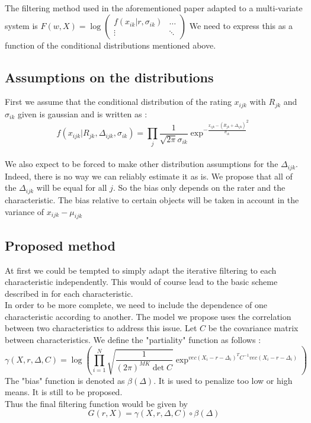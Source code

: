 The filtering method used in the aforementioned paper adapted to a multi-variate system is $F(w,X) = \log \begin{pmatrix}
f(x_{ik}|r,\sigma_{ik}) & \hdots \\
\vdots & \ddots 
\end{pmatrix}$
We need to express this as a function of the conditional distributions mentioned above.

\subsection{Assumptions on the distributions}
First we assume that the conditional distribution of the rating $x_{ijk}$ with $R_{jk}$ and $\sigma_{ik}$ given is gaussian and is written as : 
$$ f(x_{ijk}|R_{jk},\Delta_{ijk},\sigma_{ik}) = \prod_j \frac{1}{\sqrt{2 \pi} \sigma_{ik}} \exp^{-\frac{x_{ijk}-(R_{jk}+\Delta_{ijk})}{\sigma_{ik}}^2}$$\\
We also expect to be forced to make other distribution assumptions for the $\Delta_{ijk}$. Indeed, there is no way we can reliably estimate it as is. We propose that all of the $\Delta_{ijk}$ will be equal for all $j$. So the bias only depends on  the rater and the characteristic. The bias relative to certain objects will be taken in account in the variance of $x_{ijk}-\mu_{ijk}$

\subsection{Proposed method}
At first we could be tempted to simply adapt the iterative filtering to each characteristic independently. This would of course lead to the basic scheme described in \cite{Cristo1} for each characteristic.\\
In order to be more complete, we need to include the dependence of one characteristic according to another.
The model we propose uses the correlation between two characteristics to address this issue.
Let $C$ be the covariance matrix between characteristics.
We define the "partiality" function as follows :
$$\gamma(X,r,\Delta,C) = \log (\prod_{i=1}^{N} \sqrt{\frac{1}{(2\pi)^{MK}\det C}} \exp^{vec( X_i-r-\Delta_i)^TC^{-1} vec(X_i-r-\Delta_i)})$$
The "bias" function is denoted as $\beta(\Delta)$. It is used to penalize too low or high means. It is still to be proposed.\\
Thus the final filtering function would be given by 
$$G(r,X) = \gamma(X,r,\Delta,C) \circ \beta(\Delta)$$

